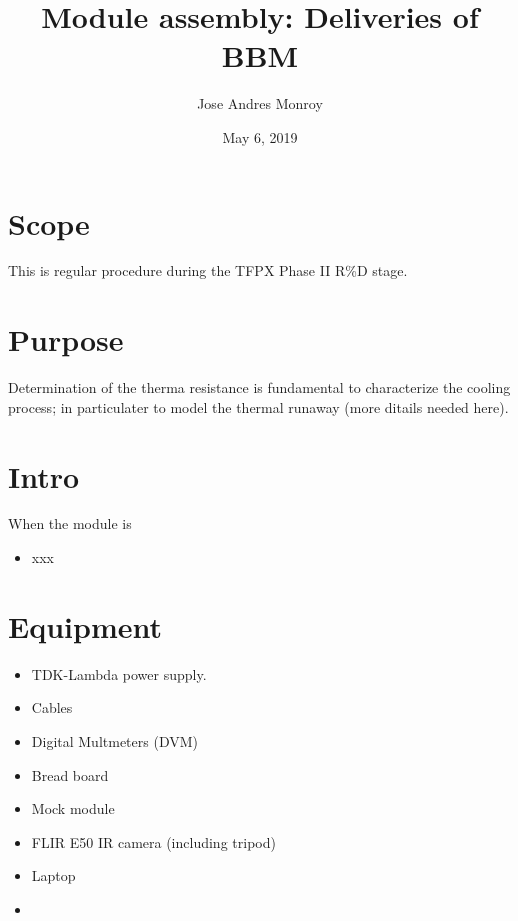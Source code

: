 \documentclass[12pt]{unlsilabsop}
\title{Module assembly: Deliveries of BBM}
\date{May 6, 2019}
\author{Jose Andres Monroy}
\begin{document}
\maketitle

\section{Scope}
This is regular procedure during the TFPX Phase II R\%D stage.

\section{Purpose}
Determination of the therma resistance is fundamental to characterize the cooling process; in particulater to model the thermal runaway (more ditails needed here).


\section{Intro}
When the module is  
\begin{itemize}
    \item xxx
\end{itemize}

\section{Equipment}

\begin{itemize}
    \item TDK-Lambda power supply.  
    \item Cables
    \item Digital Multmeters (DVM)
    \item Bread board
    \item Mock module
    \item FLIR E50 IR camera (including tripod)
    \item Laptop
    \item 
\end{itemize}
\end{document}
